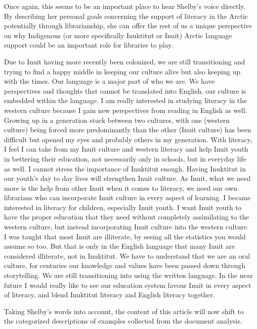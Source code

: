 \documentclass[a4paper,
fontsize=11pt,
oneside,
numbers=noperiodatend,
parskip=half-,
bibliography=totoc,
final
]{scrartcl}
\begin{document}
Once again, this seems to be an important place to hear Shelby's voice
directly. By describing her personal goals concerning the support of
literacy in the Arctic potentially through librarianship, she can offer
the rest of us a unique perspective on why Indigenous (or more
specifically Inuktitut or Inuit) Arctic language support could be an
important role for libraries to play.

Due to Inuit having more recently been colonized, we are still
transitioning and trying to find a happy middle in keeping our culture
alive but also keeping up with the times. Our language is a major part
of who we are. We have perspectives and thoughts that cannot be
translated into English, our culture is embedded within the language. I
am really interested in studying literacy in the western culture because
I gain new perspectives from reading in English as well. Growing up in a
generation stuck between two cultures, with one (western culture) being
forced more predominantly than the other (Inuit culture) has been
difficult but opened my eyes and probably others in my generation. With
literacy, I feel I can take from my Inuit culture and western literacy
and help Inuit youth in bettering their education, not necessarily only
in schools, but in everyday life as well. I cannot stress the importance
of Inuktitut enough. Having Inuktitut in our youth's day to day lives
will strengthen Inuit culture. As Inuit, what we need more is the help
from other Inuit when it comes to literacy, we need our own librarians
who can incorporate Inuit culture in every aspect of learning. I became
interested in literacy for children, especially Inuit youth. I want
Inuit youth to have the proper education that they need without
completely assimilating to the western culture, but instead
incorporating Inuit culture into the western culture. I was taught that
most Inuit are illiterate, by seeing all the statistics you would assume
so too. But that is only in the English language that many Inuit are
considered illiterate, not in Inuktitut. We have to understand that we
are an oral culture, for centuries our knowledge and values have been
passed down through storytelling. We are still transitioning into using
the written language. In the near future I would really like to see our
education system favour Inuit in every aspect of literacy, and blend
Inuktitut literacy and English literacy together.

Taking Shelby's words into account, the content of this article will now
shift to the categorized descriptions of examples collected from the
document analysis.
\end{document}
